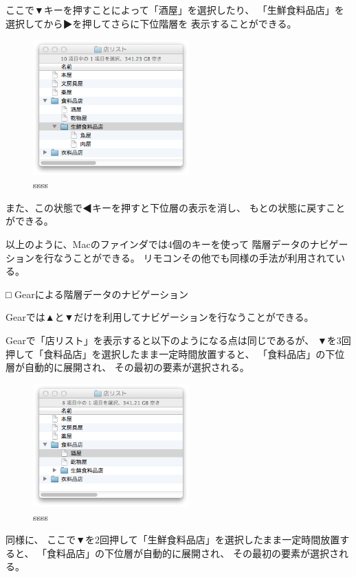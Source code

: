 \documentclass[twoside]{wiss}
\def\▲{▲}
\def\▼{▼}
\begin{document}
ここで{\▼}キーを押すことによって「酒屋」を選択したり、
「生鮮食料品店」を選択してから▶を押してさらに下位階層を
表示することができる。

\begin{figure}[H]
\centerline{\includegraphics[width=60mm,bb=0 0 344 298]{figures/ce3ee682612de44d6c663a7323c262a6.png}}
\caption{ssss}
\label{screenshot}
\end{figure}

また、この状態で◀キーを押すと下位層の表示を消し、
もとの状態に戻すことができる。

以上のように、Macのファインダでは4個のキーを使って
階層データのナビゲーションを行なうことができる。
リモコンその他でも同様の手法が利用されている。

□ Gearによる階層データのナビゲーション

Gearでは{\▲}と{\▼}だけを利用してナビゲーションを行なうことができる。

Gearで「店リスト」を表示すると以下のようになる点は同じであるが、
{\▼}を3回押して「食料品店」を選択したまま一定時間放置すると、
「食料品店」の下位層が自動的に展開され、
その最初の要素が選択される。

\begin{figure}[H]
\centerline{\includegraphics[width=60mm,bb=0 0 344 272]{figures/2387e402f81dbe7917e04df82b0a659c.png}}
\caption{ssss}
\label{screenshot}
\end{figure}

同様に、 ここで{\▼}を2回押して「生鮮食料品店」を選択したまま一定時間放置すると、
「食料品店」の下位層が自動的に展開され、
その最初の要素が選択される。
\end{document}
